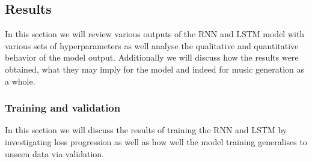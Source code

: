 \documentclass{article}
\begin{document}
\subsection{Results}
\label{sec:results}
In this section we will review various outputs of the RNN and LSTM model with various sets of hyperparameters as well analyse the qualitative and quantitative behavior of the model output. Additionally we will discuss how the results were obtained, what they may imply for the model and indeed for music generation as a whole. 

\subsubsection{Training and validation}
In this section we will discuss the results of training the RNN and LSTM by investigating loss progression as well as how well the model training generalises to unseen data via validation.
\end{document}
